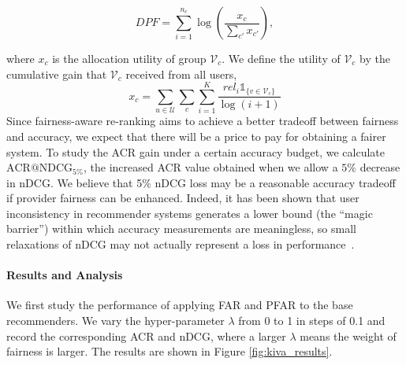 \begin{equation*}
    DPF=\sum_{i=1}^{n_c}\log\left(\frac{x_c}{\sum_{c'}x_{c'}}\right),
\end{equation*}

where $x_c$ is the allocation utility of group $\mathcal V_c$. We define the utility of $\mathcal V_c$ by the cumulative gain that $\mathcal V_c$ received from all users,
\begin{equation*}
x_c=\sum_{u\in\mathcal U}\sum_{c}\sum_{i=1}^K\frac{{rel}_i\mathds{1}_{\{v\in \mathcal V_{c}\}}}{\log(i+1)}
\end{equation*}
Since fairness-aware re-ranking aims to achieve a better tradeoff between fairness and accuracy, we expect that there will be a price to pay for obtaining a fairer system. To study the ACR gain under a certain accuracy budget, we calculate $\text{ACR@NDCG}_{5\%}$, the increased ACR value obtained when we allow a $5\%$ decrease in nDCG. We believe that 5\% nDCG loss may be a reasonable accuracy tradeoff if provider fairness can be enhanced. Indeed, it has been shown that user inconsistency in recommender systems generates a lower bound (the ``magic barrier'') within which accuracy measurements are meaningless, so small relaxations of nDCG may not actually represent a loss in performance~\cite{said2012estimating}.

\paragraph{\textbf{Results and Analysis}}

We first study the performance of applying FAR and PFAR to the base recommenders. We vary the hyper-parameter $\lambda$ from 0 to 1 in steps of 0.1 and record the corresponding ACR and nDCG, where a larger $\lambda$ means the weight of fairness is larger. The results are shown in Figure \ref{fig:kiva_results}. 

